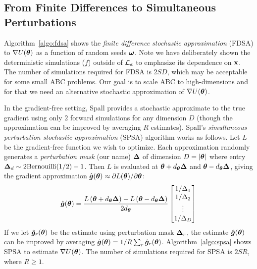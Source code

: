 \documentclass[]{article}
\begin{document}
\subsection{From Finite Differences to Simultaneous Perturbations}


Algorithm~\ref{algo:fdsa} shows the {\em finite difference stochastic approximation} (FDSA) \cite{kiefer1952stochastic} to $\nabla U({\bm \theta})$ as a function of random seeds ${\bm \omega}$.  Note we have deliberately shown the deterministic simulations ($f$) outside of $\mathcal{L}_{{\bm {\epsilon}}}$ to emphasize its dependence on ${\bf x}$.  The number of simulations required for FDSA is $2 S D$, which may be acceptable for some small ABC problems.  Our goal is to scale ABC to high-dimensions and for that we need an alternative stochastic approximation of $\nabla U({\bm \theta})$.

In the gradient-free setting, Spall \cite{spall1992multivariate, spall2000adaptive} provides a stochastic approximate to the true gradient using only $2$ forward simulations for any dimension $D$ (though the approximation can be improved by averaging $R$ estimates).  Spall's {\em simultaneous perturbation stochastic approximation} (SPSA) algorithm works as follows. Let $L$ be the gradient-free function we wish to optimize.  Each approximation randomly generates a {\em perturbation mask} (our name) ${\bm \Delta}$ of dimension $D=|{\bm \theta}|$ where entry ${\bm \Delta}_d \sim 2 \text{Bernouilli}(1/2) - 1$.  Then $L$ is evaluated at ${\bm \theta}+d_{{\bm \theta}} {\bm \Delta}$ and ${\bm \theta}-d_{{\bm \theta}} {\bm \Delta}$, giving the gradient approximation $\hat{{\bm g }}({\bm \theta}) \approx \partial L({\bm \theta}) / \partial {\bm \theta}$:
\begin{equation}
  \hat{{\bm g }}({\bm \theta}) = \frac{L\left({\bm \theta}+d_{{\bm \theta}} {\bm \Delta}\right) - L\left({\bm \theta}-d_{{\bm \theta}} {\bm \Delta}\right)}{2 d_{{\bm \theta}}} \begin{bmatrix} 
                                   1/\Delta_1 \\
                                   1/\Delta_2 \\
                                   \vdots \\
                                   1/\Delta_D \\
                                \end{bmatrix}
\end{equation}
If we let $\hat{{\bm g }}_r({\bm \theta})$ be the estimate using perturbation mask ${\bm \Delta}_r$, the estimate $\hat{{\bm g }}({\bm \theta})$ can be improved by averaging $\hat{{\bm g }}({\bm \theta}) = 1/R \sum_r \hat{{\bm g }}_r({\bm \theta})$.
Algorithm~\ref{algo:spsa} shows SPSA to estimate $\nabla U({\bm \theta})$.  The number of simulations required for SPSA is $2 S R$, where $R \geq 1$.
\end{document}
